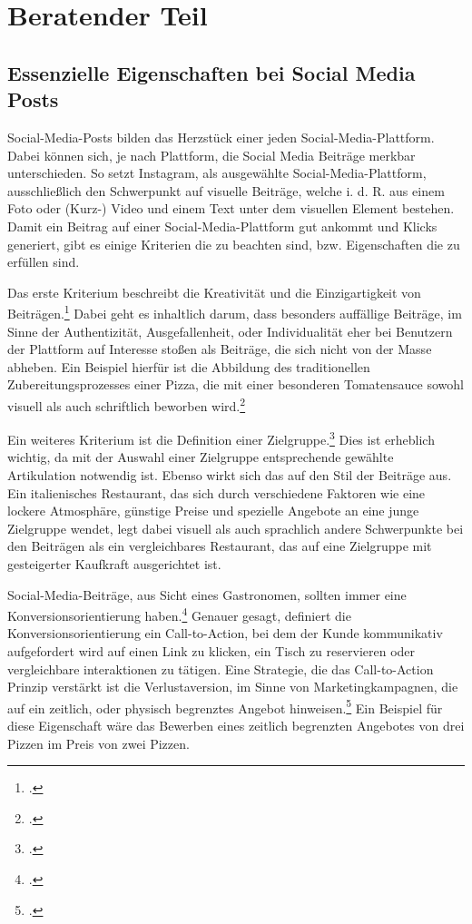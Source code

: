 \newpage
\section{Beratender Teil} \label{sec:beratender-teil}

\subsection{Essenzielle Eigenschaften bei Social Media Posts}
Social-Media-Posts bilden das Herzstück einer jeden Social-Media-Plattform.
Dabei können sich, je nach Plattform, die Social Media Beiträge merkbar unterschieden.
So setzt Instagram, als ausgewählte Social-Media-Plattform, ausschließlich den Schwerpunkt auf visuelle Beiträge, welche i. d. R. aus einem Foto oder (Kurz-) Video und einem Text unter dem visuellen Element bestehen.
Damit ein Beitrag auf einer Social-Media-Plattform gut ankommt und Klicks generiert, gibt es einige Kriterien die zu beachten sind, bzw. Eigenschaften die zu erfüllen sind.

Das erste Kriterium beschreibt die Kreativität und die Einzigartigkeit von Beiträgen.\footcite{kaplan_users_2010,keller_building_1993}
Dabei geht es inhaltlich darum, dass besonders auffällige Beiträge, im Sinne der Authentizität, Ausgefallenheit, oder Individualität eher bei Benutzern der Plattform auf Interesse stoßen als Beiträge, die sich nicht von der Masse abheben.
Ein Beispiel hierfür ist die Abbildung des traditionellen Zubereitungsprozesses einer Pizza, die mit einer besonderen Tomatensauce sowohl visuell als auch schriftlich beworben wird.\footcite{green_role_2000}

Ein weiteres Kriterium ist die Definition einer Zielgruppe.\footcite{kotler_marketing_management}
Dies ist erheblich wichtig, da mit der Auswahl einer Zielgruppe entsprechende gewählte Artikulation notwendig ist.
Ebenso wirkt sich das auf den Stil der Beiträge aus.
Ein italienisches Restaurant, das sich durch verschiedene Faktoren wie eine lockere Atmosphäre, günstige Preise und spezielle Angebote an eine junge Zielgruppe wendet, legt dabei visuell als auch sprachlich andere Schwerpunkte bei den Beiträgen als ein vergleichbares Restaurant, das auf eine Zielgruppe mit gesteigerter Kaufkraft ausgerichtet ist.

Social-Media-Beiträge, aus Sicht eines Gastronomen, sollten immer eine Konversionsorientierung haben.\footcite{website_quality_customer_satisfaction}
Genauer gesagt, definiert die Konversionsorientierung ein Call-to-Action, bei dem der Kunde kommunikativ aufgefordert wird auf einen Link zu klicken, ein Tisch zu reservieren oder vergleichbare interaktionen zu tätigen.
Eine Strategie, die das Call-to-Action Prinzip verstärkt ist die Verlustaversion, im Sinne von Marketingkampagnen, die auf ein zeitlich, oder physisch begrenztes Angebot hinweisen.\footcite{jstor_example}
Ein Beispiel für diese Eigenschaft wäre das Bewerben eines zeitlich begrenzten Angebotes von drei Pizzen im Preis von zwei Pizzen.


